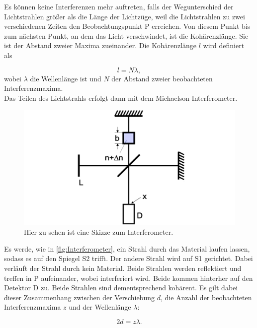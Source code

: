 Es können keine Interferenzen mehr auftreten, falls der Wegunterschied der Lichtstrahlen größer als die Länge der Lichtzüge, weil die Lichtstrahlen zu zwei verschiedenen Zeiten den Beobachtungspunkt P erreichen. Von diesem Punkt bis zum nächsten Punkt, an dem das Licht verschwindet, ist die Kohärenzlänge. Sie ist der Abstand zweier Maxima zueinander. Die Kohärenzlänge \(l\) wird definiert als

\begin{equation}
    l = N\lambda,
\end{equation}
wobei \(\lambda\) die Wellenlänge ist und \(N\) der Abstand zweier beobachteten Interferenzmaxima.
\\
Das Teilen des Lichtstrahls erfolgt dann mit dem Michaelson-Interferometer.

\begin{figure}
    \centering
    \includegraphics[scale = 0.3]{content/Interferometer.pdf}
    \caption{Hier zu sehen ist eine Skizze zum Interferometer.}
    \label{fig:Interferometer}
\end{figure}

Es werde, wie in \autoref{fig:Interferometer}, ein Strahl durch das Material laufen lassen, sodass es auf den Spiegel S2 trifft. Der andere Strahl wird auf S1 gerichtet. Dabei verläuft der Strahl durch kein Material. Beide Strahlen werden reflektiert und treffen in P aufeinander, wobei interferiert wird. Beide kommen hinterher auf den Detektor D zu. Beide Strahlen sind dementsprechend kohärent. Es gilt dabei dieser Zusammenhang zwischen der Verschiebung \(d\), die Anzahl der beobachteten Interferenzmaxima \(z\) und der Wellenlänge \(\lambda\):

\begin{equation}
   2d=z\lambda.
   \label{eq:verschiebung}
\end{equation}

